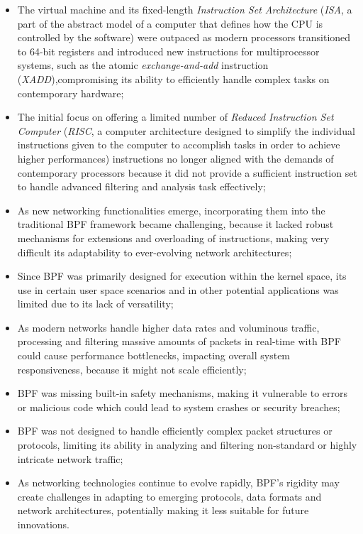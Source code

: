 \begin{itemize}
	\item 
		The virtual machine and its fixed-length \textit{Instruction Set Architecture} (\textit{ISA}, a part of the abstract model of a computer that defines how the CPU is controlled by the software) were outpaced as modern processors transitioned to 64-bit registers and introduced new instructions for multiprocessor systems, such as the atomic \textit{exchange-and-add} instruction (\textit{XADD}),compromising its ability to efficiently handle complex tasks on contemporary hardware;
	\item 
		The initial focus on offering a limited number of \textit{Reduced Instruction Set Computer} (\textit{RISC}, a computer architecture designed to simplify the individual instructions given to the computer to accomplish tasks in order to achieve higher performances) instructions no longer aligned with the demands of contemporary processors because it did not provide a sufficient instruction set to handle advanced filtering and analysis task effectively;
	\item 
		As new networking functionalities emerge, incorporating them into the traditional BPF framework became challenging, because it lacked robust mechanisms for extensions and overloading of instructions, making very difficult its adaptability to ever-evolving network architectures;
	\item 
		Since BPF was primarily designed for execution within the kernel space, its use in certain user space scenarios and in other potential applications was limited due to its lack of versatility;
	\item 
		As modern networks handle higher data rates and voluminous traffic, processing and filtering massive amounts of packets in real-time with BPF could cause performance bottlenecks, impacting overall system responsiveness, because it might not scale efficiently;
	\item 
		BPF was missing built-in safety mechanisms, making it vulnerable to errors or malicious code which could lead to system crashes or security breaches;
	\item 
		BPF was not designed to handle efficiently complex packet structures or protocols, limiting its ability in analyzing and filtering non-standard or highly intricate network traffic;
	\item 
		As networking technologies continue to evolve rapidly, BPF's rigidity may create challenges in adapting to emerging protocols, data formats and network architectures, potentially making it less suitable for future innovations.
\end{itemize} 

